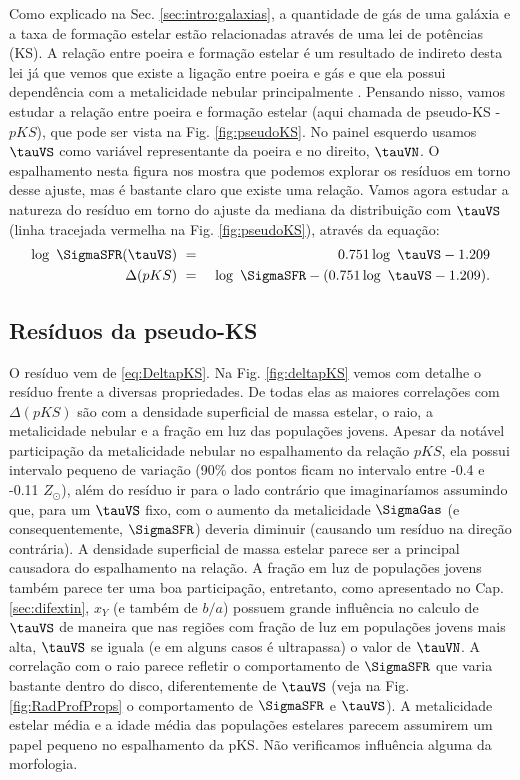 Como explicado na Sec. \ref{sec:intro:galaxias}, a quantidade de gás de uma galáxia e a taxa de
formação estelar estão relacionadas através de uma lei de potências (KS). A relação entre poeira e
formação estelar é um resultado de indireto desta lei já que vemos que existe a ligação entre poeira
e gás e que ela possui dependência com a metalicidade nebular principalmente \citep[][e suas
referências]{Magdis.etal.2011a, Leroy.etal.2011a, Santini.etal.2014a}. Pensando nisso, vamos estudar
a relação entre poeira e formação estelar (aqui chamada de pseudo-KS - $pKS$), que pode ser vista na
Fig. \ref{fig:pseudoKS}. No painel esquerdo usamos $\tauVS$ como variável representante da poeira e
no direito, $\tauVN$. O espalhamento nesta figura nos mostra que podemos explorar os resíduos em
torno desse ajuste, mas é bastante claro que existe uma relação. Vamos agora estudar a natureza
do resíduo em torno do ajuste da mediana da distribuição com $\tauVS$ (linha tracejada vermelha na
Fig. \ref{fig:pseudoKS}), através da equação:
\begin{eqnarray}
	\log\ \SigmaSFR(\tauVS)\ &=&\ 0.751 \log\ \tauVS - 1.209 \\
	\label{eq:pKS_1stadj}
	\Delta(pKS)\ &=&\ \log\ \SigmaSFR - (0.751 \log\ \tauVS - 1.209).
	\label{eq:DeltapKS}
\end{eqnarray}

\subsection{Resíduos da pseudo-KS}
\label{sec:gasfrac:KS:resid}

O resíduo vem de \eqref{eq:DeltapKS}. Na Fig. \ref{fig:deltapKS} vemos com detalhe o resíduo frente
a diversas propriedades. De todas elas as maiores correlações com $\Delta(pKS)$ são com a densidade
superficial de massa estelar, o raio, a metalicidade nebular e a fração em luz das populações
jovens. Apesar da notável participação da metalicidade nebular no espalhamento da relação $pKS$, ela
possui intervalo pequeno de variação (90\% dos pontos ficam no intervalo entre -0.4 e -0.11
$Z_\odot$), além do resíduo ir para o lado contrário que imaginaríamos assumindo que, para um
$\tauVS$ fixo, com o aumento da metalicidade $\SigmaGas$ (e consequentemente, $\SigmaSFR$) deveria
diminuir (causando um resíduo na direção contrária). A densidade superficial de massa estelar parece
ser a principal causadora do espalhamento na relação. A fração em luz de populações jovens também
parece ter uma boa participação, entretanto, como apresentado no Cap. \ref{sec:difextin}, $x_Y$ (e
também de $b/a$) possuem grande influência no calculo de $\tauVS$ de maneira que nas regiões com
fração de luz em populações jovens mais alta, $\tauVS$ se iguala (e em alguns casos é ultrapassa) o
valor de $\tauVN$. A correlação com o raio parece refletir o comportamento de $\SigmaSFR$ que varia
bastante dentro do disco, diferentemente de $\tauVS$ (veja na Fig. \ref{fig:RadProfProps} o
comportamento de $\SigmaSFR$ e $\tauVS$). A metalicidade estelar média e a idade média das
populações estelares parecem assumirem um papel pequeno no espalhamento da pKS. Não verificamos
influência alguma da morfologia.

